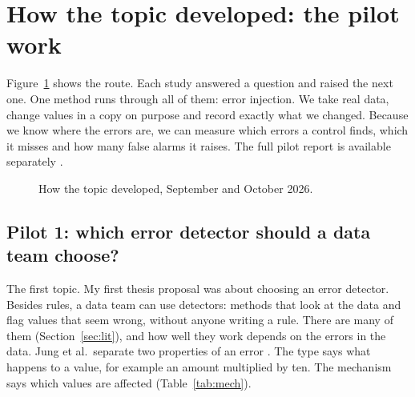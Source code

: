 \documentclass[11pt,a4paper]{article}
\begin{document}
\section{How the topic developed: the pilot work}
\label{sec:pilots}

Figure~\ref{fig:route} shows the route. Each study answered a question and raised the next one. One method runs through all of them: error injection. We take real data, change values in a copy on purpose and record exactly what we changed. Because we know where the errors are, we can measure which errors a control finds, which it misses and how many false alarms it raises. The full pilot report is available separately \cite{pilotreport}.

\begin{figure}[htbp]
\centering
{}
\caption{How the topic developed, September and October 2026.}
\label{fig:route}
\end{figure}

\subsection{Pilot 1: which error detector should a data team choose?}

The first topic. My first thesis proposal was about choosing an error detector. Besides rules, a data team can use detectors: methods that look at the data and flag values that seem wrong, without anyone writing a rule. There are many of them (Section~\ref{sec:lit}), and how well they work depends on the errors in the data. Jung et al.\ separate two properties of an error \cite{taberr}. The type says what happens to a value, for example an amount multiplied by ten. The mechanism says which values are affected (Table~\ref{tab:mech}).
\end{document}

